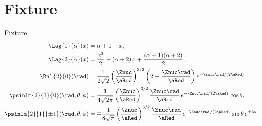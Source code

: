 \chapter{Fixture}\label{c11}

Fixture.
\begin{align}
  \Lag{1}{\alpha}(x) &= \alpha + 1 - x,
    \label{c11.eq.lag1} \\
  \Lag{2}{\alpha}(x) &= \frac{x^2}{2} - (\alpha + 2)\,x + \frac{(\alpha + 1)(\alpha + 2)}{2},
    \label{c11.eq.lag2} \\
  \Rnl{2}{0}(\rad) &= \frac{1}{2\sqrt{2}}\left(\frac{\Znuc}{\aRed}\right)^{3/2}\left(2 - \frac{\Znuc\rad}{\aRed}\right) e^{-\Znuc\rad/(2\aRed)},
    \label{c11.eq.r20} \\
  \psinlm{2}{1}{0}(\rad, \theta, \phi) &= \frac{1}{4\sqrt{2\pi}}\left(\frac{\Znuc}{\aRed}\right)^{3/2}\frac{\Znuc\rad}{\aRed}\,e^{-\Znuc\rad/(2\aRed)}\,\cos\theta,
    \label{c11.eq.psi210} \\
  \psinlm{2}{1}{\pm 1}(\rad, \theta, \phi) &= \mp\frac{1}{8\sqrt{\pi}}\left(\frac{\Znuc}{\aRed}\right)^{3/2}\frac{\Znuc\rad}{\aRed}\,e^{-\Znuc\rad/(2\aRed)}\,\sin\theta\,e^{\pm i\phi}.
    \label{c11.eq.psi21pm}
\end{align}
